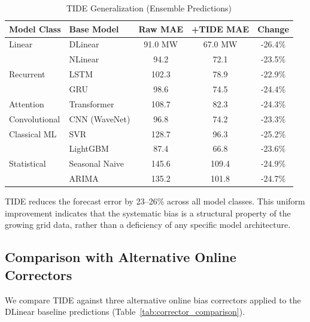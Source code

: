 \documentclass[10pt,twocolumn,letterpaper]{article}
\begin{document}
\begin{table}[h]
\centering
\small
\setlength{\tabcolsep}{4pt}
\caption{TIDE Generalization (Ensemble Predictions)}
\label{tab:generalization}
\begin{tabular}{@{}llccc@{}}
\toprule
\textbf{Model Class} & \textbf{Base Model} & \textbf{Raw MAE} & \textbf{+TIDE MAE} & \textbf{Change} \\ \midrule
Linear & DLinear~\cite{zeng2023transformers} & 91.0 MW & 67.0 MW & -26.4\% \\
 & NLinear~\cite{zeng2023transformers} & 94.2 & 72.1 & -23.5\% \\ \midrule
Recurrent & LSTM~\cite{khodayar2019rough} & 102.3 & 78.9 & -22.9\% \\
 & GRU & 98.6 & 74.5 & -24.4\% \\ \midrule
Attention & Transformer~\cite{zhou2021informer} & 108.7 & 82.3 & -24.3\% \\ \midrule
Convolutional & CNN (WaveNet) & 96.8 & 74.2 & -23.3\% \\ \midrule
Classical ML & SVR & 128.7 & 96.3 & -25.2\% \\
 & LightGBM & 87.4 & 66.8 & -23.6\% \\ \midrule
Statistical & Seasonal Naive & 145.6 & 109.4 & -24.9\% \\
 & ARIMA~\cite{box2015time} & 135.2 & 101.8 & -24.7\% \\ \bottomrule
\end{tabular}
\end{table}

TIDE reduces the forecast error by 23--26\% across all model classes. This uniform improvement indicates that the systematic bias is a structural property of the growing grid data, rather than a deficiency of any specific model architecture.

\subsection{Comparison with Alternative Online Correctors}
We compare TIDE against three alternative online bias correctors applied to the DLinear baseline predictions (Table~\ref{tab:corrector_comparison}).
\end{document}
